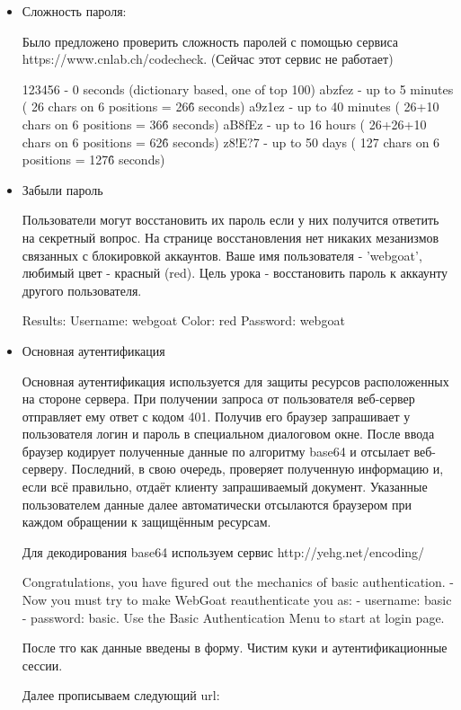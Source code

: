\documentclass{article}
\begin{document}
\begin{itemize}
	
	\item Сложность пароля:
	
	Было предложено проверить сложность паролей с помощью сервиса  https://www.cnlab.ch/codecheck. (Сейчас этот сервис не работает)
	
	123456 - 0 seconds (dictionary based, one of top 100)
	abzfez - up to 5 minutes ( 26 chars on 6 positions = 26\^6 seconds)
	a9z1ez - up to 40 minutes ( 26+10 chars on 6 positions = 36\^6 seconds)
	aB8fEz - up to 16 hours ( 26+26+10 chars on 6 positions = 62\^6 seconds)
	z8!E?7 - up to 50 days ( 127 chars on 6 positions = 127\^6 seconds)
	
	\item Забыли пароль
	
	Пользователи могут восстановить их пароль если у них получится ответить на секретный вопрос. На странице
	восстановления нет никаких мезанизмов связанных с блокировкой аккаунтов. Ваше имя пользователя - 'webgoat',
	любимый цвет - красный (red). Цель урока - восстановить пароль к аккаунту другого пользователя.
	
	Results:
	Username: webgoat
	Color: red
	Password: webgoat
	
	\item Основная аутентификация
	
	Основная аутентификация используется для защиты ресурсов расположенных на стороне сервера.
	При получении запроса от пользователя веб-сервер отправляет ему ответ с кодом 401.
	Получив его браузер запрашивает у пользователя логин и пароль в специальном диалоговом окне. После
	ввода браузер кодирует полученные данные по алгоритму base64 и отсылает веб-серверу.
	Последний, в свою очередь, проверяет полученную информацию и, если всё правильно, отдаёт клиенту запрашиваемый
	документ. Указанные пользователем данные далее автоматически отсылаются браузером при каждом обращении к
	защищённым ресурсам.
	
	Для декодирования base64 используем сервис http://yehg.net/encoding/
	
	Congratulations, you have figured out the mechanics of basic authentication.  
	- Now you must try to make WebGoat reauthenticate you as:
	- username: basic     
	- password: basic. 
	Use the Basic Authentication Menu to start at login page.
	
	После тго как данные введены в форму. Чистим куки и аутентификационные сессии.
	
	Далее прописываем следующий url: 
	

\end{itemize}
\end{document}
